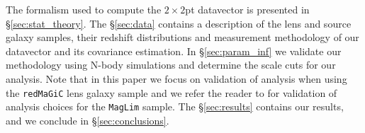 \documentclass[aps, prd,twocolumn,superscriptaddress,nofootinbib,preprintnumbers]{revtex4-1}
\newcommand{\redmagic}{\texttt{redMaGiC} }
\newcommand{\maglim}{\texttt{MagLim} }
\newcommand{\blue}[1]{\textcolor{blue}{#1}}
\begin{document}



The formalism used to compute the $2\times2$pt datavector is presented in \S\ref{sec:stat_theory}. The \S\ref{sec:data} contains a description of the lens and source galaxy samples, their redshift distributions and measurement methodology of our datavector and its covariance estimation. In \S\ref{sec:param_inf} we validate our methodology using N-body simulations and determine the scale cuts for our analysis. Note that in this paper we focus on validation of analysis when using the \redmagic lens galaxy sample and we refer the reader to \citet{y3-2x2ptaltlensresults} for validation of analysis choices for the \maglim sample. The \S\ref{sec:results} contains our results, and we conclude in \S\ref{sec:conclusions}. 
\end{document}

